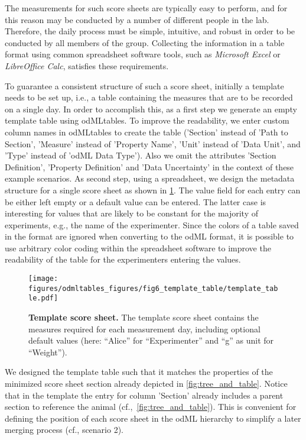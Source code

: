 {The measurements for such score sheets are typically easy to perform, and for this reason may be conducted by a number of different people in the lab. Therefore, the daily process must be simple, intuitive, and robust in order to be conducted by all members of the group. Collecting the information in a table format using common spreadsheet software tools, such as \textit{Microsoft Excel} or \textit{LibreOffice Calc}, satisfies these requirements. 

To guarantee a consistent structure of such a score sheet, initially a template needs to be set up, i.e., a table containing the measures that are to be recorded on a single day. In order to accomplish this, as a first step we generate an empty template table using odMLtables. To improve the readability, we enter custom column names in odMLtables to create the table ('Section' instead of 'Path to Section', 'Measure' instead of 'Property Name', 'Unit' instead of 'Data Unit', and 'Type' instead of 'odML Data Type'). Also we omit the attributes 'Section Definition', 'Property Definition' and 'Data Uncertainty' in the context of these example scenarios. As second step, using a spreadsheet, we design the metadata structure for a single score sheet as shown in \cref{fig:template_table}. The value field for each entry can be either left empty or a default value can be entered. The latter case is interesting for values that are likely to be constant for the majority of experiments, e.g., the name of the experimenter. Since the colors of a table saved in the  format are ignored when converting to the odML format, it is possible to use arbitrary color coding within the spreadsheet software to improve the readability of the table for the experimenters entering the values.

\begin{figure}[!ht]
\begin{center}
\texttt{[image: figures/odmltables\_figures/fig6\_template\_table/template\_table.pdf]}
\caption[Template score sheet]{\label{fig:template_table}
\textbf{Template score sheet.} The template score sheet contains the measures required for each measurement day, including optional default values (here: ``Alice'' for ``Experimenter'' and ``g'' as unit for ``Weight'').}
\end{center}
\end{figure}

We designed the template table such that it matches the properties of the minimized score sheet section already depicted in \cref{fig:tree_and_table}. Notice that in the template the entry for column 'Section' already includes a parent section to reference the animal (cf.,~\cref{fig:tree_and_table}). This is convenient for defining the position of each score sheet in the odML hierarchy to simplify a later merging process (cf., scenario 2).

}
